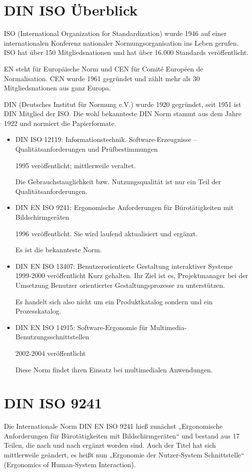 \section{DIN ISO Überblick}
ISO (International Organization for Standardization) wurde 1946 auf einer internationalen Konferenz nationaler Normungsorganisation ins Leben gerufen. ISO hat über 150 Mitgliedsnationen und hat über 16.000 Standards veröffentlicht.

EN steht für Europäische Norm und CEN für Comité Européen de Normalisation. CEN wurde 1961 gegründet und zählt mehr als 30 Mitgliedsnationen aus ganz Europa.

DIN (Deutsches Institut für Normung e.V.) wurde 1920 gegründet, seit 1951 ist DIN Mitglied der ISO. Die wohl bekannteste DIN Norm stammt aus dem Jahre 1922 und normiert die Papierformate.

\begin{itemize}
\item DIN ISO 12119: Informationstechnik. Software-Erzeugnisse – Qualitätsanforderungen und Prüfbestimmungen

1995 veröffentlicht; mittlerweile veraltet.

Die Gebrauchstauglichkeit bzw. Nutzungsqualität ist nur ein Teil der Qualitätsanforderungen.
\item DIN EN ISO 9241: Ergonomische Anforderungen für Bürotätigkeiten mit Bildschirmgeräten 

1996 veröffentlicht. Sie wird laufend aktualisiert und ergänzt.

Es ist die bekannteste Norm.
\item DIN EN ISO 13407: Benutzerorientierte Gestaltung interaktiver Systeme
1999-2000 veröffentlicht Kurz gehalten. Ihr Ziel ist es, Projektmanager bei der Umsetzung Benutzer orientierter Gestaltungsprozesse zu unterstützen.
 
Es handelt sich also nicht um ein Produktkatalog sondern und ein Prozesskatalog.
\item DIN EN ISO 14915: Software-Ergonomie für Multimedia-Benutzungsschnittstellen

2002-2004 veröffentlicht 

Diese Norm findet ihren Einsatz bei multimedialen Anwendungen.
\end{itemize}

\section{DIN ISO 9241}
Die Internationale Norm DIN EN ISO 9241 hieß zunächst „Ergonomische Anforderungen für Bürotätigkeiten mit Bildschirmgeräten“ und bestand aus 17 Teilen, die nach und nach ergänzt worden sind. Auch der Titel hat sich mittlerweile geändert, es heißt nun „Ergonomie der Nutzer-System Schnittstelle“ (Ergonomics of Human-System Interaction).


